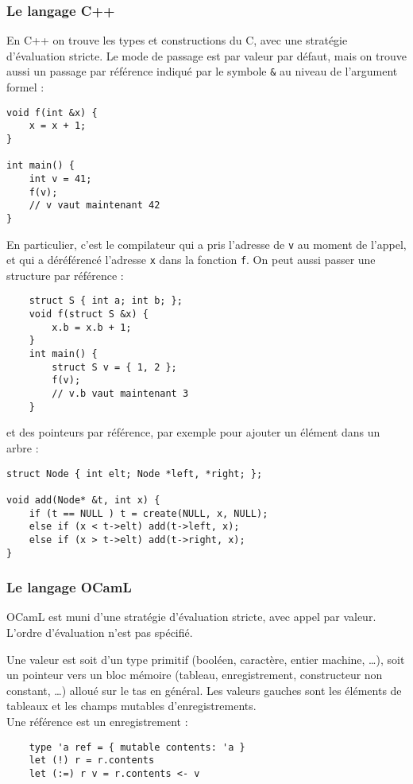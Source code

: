 \documentclass{cours}
\begin{document}
\subsubsection{Le langage C++}
En C++ on trouve les types et constructions du C, avec une stratégie d'évaluation stricte. Le mode de passage est par valeur par défaut, mais on trouve aussi un passage par référence indiqué par le symbole \texttt{\&} au niveau de l'argument formel :
\begin{verbatim}
void f(int &x) {
    x = x + 1;
}

int main() {
    int v = 41;
    f(v);
    // v vaut maintenant 42
}
\end{verbatim}
En particulier, c'est le compilateur qui a pris l'adresse de \texttt{v} au moment de l'appel, et qui a déréférencé l'adresse \texttt{x} dans la fonction \texttt{f}. On peut aussi passer une structure par référence :
\begin{verbatim}
    struct S { int a; int b; };
    void f(struct S &x) {
        x.b = x.b + 1;
    }
    int main() {
        struct S v = { 1, 2 };
        f(v);
        // v.b vaut maintenant 3
    }
\end{verbatim}
et des pointeurs par référence, par exemple pour ajouter un élément dans un arbre :
\begin{verbatim}
struct Node { int elt; Node *left, *right; };

void add(Node* &t, int x) {
    if (t == NULL ) t = create(NULL, x, NULL);
    else if (x < t->elt) add(t->left, x);
    else if (x > t->elt) add(t->right, x);
}
\end{verbatim}

\subsubsection{Le langage OCamL}
OCamL est muni d'une stratégie d'évaluation stricte, avec appel par valeur. L'ordre d'évaluation n'est pas spécifié.

Une valeur est soit d'un type primitif (booléen, caractère, entier machine, \dots), soit un pointeur vers un bloc mémoire (tableau, enregistrement, constructeur non constant, \dots) alloué sur le tas en général. Les valeurs gauches sont les éléments de tableaux et les champs mutables d'enregistrements. \\

Une référence est un enregistrement :
\begin{verbatim}
    type 'a ref = { mutable contents: 'a }
    let (!) r = r.contents
    let (:=) r v = r.contents <- v
\end{verbatim}
\end{document}
